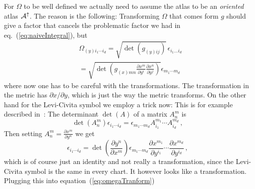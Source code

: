             For $\Omega$ to be well defined we actually need to assume the atlas to be an \textit{oriented}
            atlas $\mathcal{A}^\uparrow$.
            The reason is the following:
            Transforming $\Omega$ that comes form $g$ should give a factor that cancels the problematic factor
            we had in eq.~(\ref{eq:naiveIntegral}), but
            \begin{align}
                \label{eq:omegaTranform}&\Omega_{(y)i_1\cdots i_d} = \sqrt{\det(g_{(y)ij})}\, \epsilon_{i_1\ldots i_d}\\
                \nonumber&= \sqrt{\det\left( g_{(x)mn}\frac{\partial x^m}{\partial y^i}\frac{\partial x^n}{\partial y^j} \right)}
                \epsilon_{m_1\cdots m_d}
            \end{align}
            where now one has to be careful with the transformations.
            The transformation in the metric has $\partial x / \partial y$, which is just the way the metric transforms.
            On the other hand for the Levi-Civita symbol we employ a trick now:
            This is for example described in~\cite{Carroll}:
            The determinant $\det(A)$ of a matrix $A^m_n$ is
            \begin{equation}
                \det(A^m_n) \epsilon_{i_1\cdots i_d} = \epsilon_{m_1\cdots m_d}A^{m_1}_{i_1}\cdots A^{m_d}_{i_d}\,,
            \end{equation}
            Then setting $A^m_n = \frac{\partial x^m}{\partial y^n}$ we get
            \begin{equation}
                \epsilon_{i_1\cdots i_d} = \det\left( \frac{\partial y^n}{\partial x^m} \right)
                \epsilon_{m_1\cdots m_d} \frac{\partial x^{m_1}}{\partial y^{i_1}}\cdots \frac{\partial x^{m_d}}{\partial y^{i_d}}\,,
            \end{equation}
            which is of course just an identity and not really a transformation, since the Levi-Civita symbol is the same in
            every chart.
            It however looks like a transformation.
            Plugging this into equation~(\ref{eq:omegaTranform})
